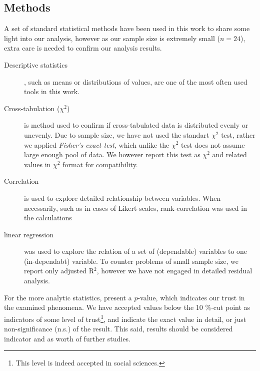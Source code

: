 \subsection{Methods}
\label{sec:methods}


A set of standard statistical methods have been used in this work to share some light into our analysis, however as our sample size is extremely small ($n=24$), extra care is needed to confirm our analysis results.

\begin{description}
\item[Descriptive statistics], such as means or distributions of values, are one of the most often used tools in this work.
\item[Cross-tabulation ($\chi^2$)] is method used to confirm if cross-tabulated data is distributed evenly or unevenly. Due to sample size, we have not used the standart $\chi^2$ test, rather we applied \textit{Fisher's exact test}, which unlike the $\chi^2$ test does not assume large enough pool of data. We however report this test as $\chi^2$ and related values in $\chi^2$ format for compatibility.
\item[Correlation] is used to explore detailed relationship between variables. When necessarily, such as in cases of Likert-scales, rank-correlation was used in the calculations
\item[linear regression] was used to explore the relation of a set of (dependable) variables to one (in-dependabt) variable. To counter problems of small sample size, we report only adjusted R$^2$, however we have not engaged in detailed residual analysis.
\end{description}

For the more analytic statistics, present a $p$-value, which indicates our trust in the examined phenomena. We have accepted values below the 10 \%-cut point as indicators of some level of trust\footnote{This level is indeed accepted in social sciences.}, and indicate the exact value in detail, or just non-significance (n.s.) of the result. This said, results should be considered indicator and as worth of further studies.


